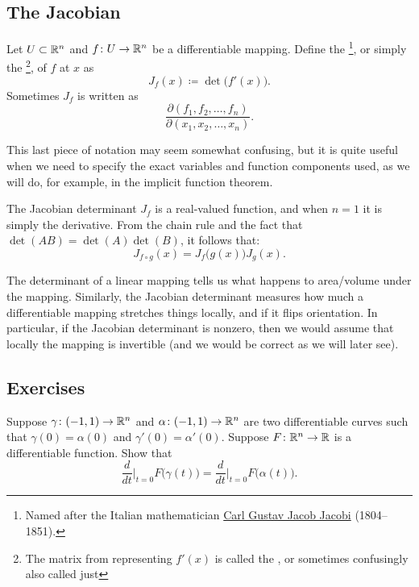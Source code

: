 \subsection{The Jacobian}

\begin{defn}
Let $U \subset {\mathbb{R}}^n$ and
$f \colon U \to {\mathbb{R}}^n$ be a differentiable mapping.  Define the
\emph{}%
\footnote{Named after the Italian mathematician
\href{https://en.wikipedia.org/wiki/Carl_Gustav_Jacob_Jacobi}{Carl Gustav Jacob Jacobi}
(1804--1851).},
or simply the
\emph{}%
\footnote{The matrix from  representing $f'(x)$
is called the
\emph{}, or sometimes confusingly also called just
},
of $f$ at $x$ as
\begin{equation*}
J_f(x) \coloneqq \det\bigl( f'(x) \bigr) .
\end{equation*}
Sometimes $J_f$ is written as
\begin{equation*}
\frac{\partial(f_1,f_2,\ldots,f_n)}{\partial(x_1,x_2,\ldots,x_n)} .
\end{equation*}
\end{defn}

This last piece of notation may seem somewhat confusing,
but it is quite useful when we need to specify
the exact variables and function components used,
as we will do, for example, in the implicit function theorem.

The Jacobian determinant $J_f$ is a real-valued function, and when $n=1$ it is simply the
derivative.
From the chain rule and the fact that $\det(AB) = \det(A)\det(B)$, it follows that:
\begin{equation*}
J_{f \circ g} (x) = J_f\bigl(g(x)\bigr) J_g(x) .
\end{equation*}

The determinant of a linear mapping tells us what happens to
area/volume under the mapping.
Similarly, the Jacobian determinant measures how much a differentiable mapping stretches
things locally, and if it flips orientation.  In particular, if the Jacobian
determinant
is nonzero, then we would assume that locally the mapping is invertible (and
we would be correct as we will later see).

\subsection{Exercises}

\begin{exercise}
Suppose $\gamma \colon (-1,1) \to {\mathbb{R}}^n$ and
$\alpha \colon (-1,1) \to {\mathbb{R}}^n$ are two differentiable curves
such that $\gamma(0) = \alpha(0)$ and $\gamma'(0) = \alpha'(0)$.
Suppose $F \colon {\mathbb{R}}^n \to {\mathbb{R}}$ is a differentiable function.  Show that
\begin{equation*}
\frac{d}{dt}\Big|_{t=0}
F\bigl(\gamma(t)\bigr)
=
\frac{d}{dt}\Big|_{t=0}
F\bigl(\alpha(t)\bigr)
.
\end{equation*}
\end{exercise}


